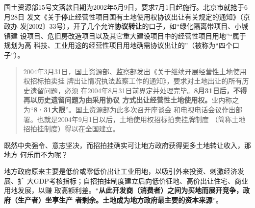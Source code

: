 国土资源部15号文落款日期为2002年5月9日，要求7月1日起施行。北京市就抢于6月28日
发文《关于停止经营性项目国有土地使用权协议出让有关规定的通知》（京政办
发[2002〕33号），开了几个允许\textbf{协议转让}的口子，如“绿化隔离带项目、小城镇建
设项目、危旧房改造项目以及其它重大建设项目中的经营性项目用地”“属于规划为高
科技、工业用途的经营性项目用地确需协议出让的”（被称为“四个口子”）。

\begin{quotation}
2004年3月31日，国土资源部、监察部发出《关于继续开展经营性土地使用权招标拍卖挂
牌出让情况执法监察工作的通知》，要求对土地出让的所有历史遗留问题，必须
在2004年8月31日前界定并处理完毕。\textbf{8月31日后，不得再以历史遗留问题为由采用协议
方式出让经营性土地使用权。}业内称之为“\textbf{8·31大限}”。国土资源部为此多次召开座谈会
和电视电话会议作出部署。也就是2004年9月1日以后，土地使用权招标拍卖挂牌制度
（简称土地招拍挂制度）得以在全国建立。
\end{quotation}

既然中央强令、意志坚决，而招拍挂确实可让地方政府获得更多土地转让收入，那地方
何乐而不为呢？

地方政府原来主要是低价或零低价出让工业用地，以吸引外来投资、刺激经济发展、扩
大GDP考核指标；自招拍挂制度建立后向低价征地、高价出让住宅、商业用地发展，以赚
取高额利差。“\textbf{从此开发商（消费者）之间为买地而展开竞争，政府（生产者）坐享生产
者剩余。土地成为地方政府最主要的资本来源}”\cite{dajueqi}。

